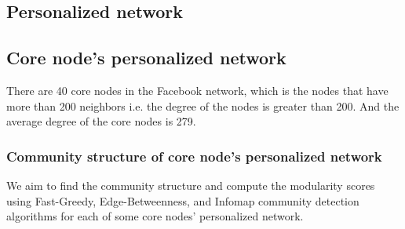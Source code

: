 \documentclass[11pt]{article}
\begin{document}
\subsection{Personalized network}


\subsection{Core node’s personalized network}

There are 40 core nodes in the Facebook network, which is the nodes that have more than 200 neighbors i.e. the degree of the nodes is greater than 200. And the average degree of the core nodes is 279.
\subsubsection{Community structure of core node’s personalized network}

We aim to find the community structure and compute the modularity scores using Fast-Greedy, Edge-Betweenness, and Infomap community detection algorithms for each of some core nodes’ personalized network.
\end{document}
